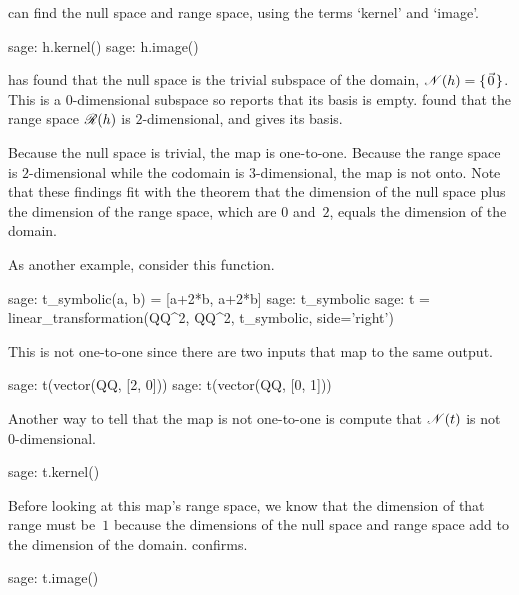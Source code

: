 \Sage{} can find the null space 
and range space, using the 
terms `kernel' and `image'.
\begin{sagecommandline}
sage: h.kernel()                                       
sage: h.image()                                        
\end{sagecommandline}
\Sage{} has found that 
the null space  is the trivial subspace of the domain,
$\mathscr{N}(h)=\mbox{$\{\hspace{0.1em}\vec{0}\hspace{0.1em}\}$}$.
This is a $0$-dimensional
subspace so \Sage{} reports that its basis is empty.
\Sage{} found that the range space $\mathscr{R}(h)$ is $2$-dimensional,
and gives its  basis. 

Because the null space is trivial, the map is one-to-one. 
Because the range space is $2$-dimensional while 
the codomain is $3$-dimensional, the map is not onto.
Note that these findings fit with the theorem that
the dimension of the null space plus the dimension of the 
range space, which are $0$ and~$2$, equals the dimension of the domain.

As another example, consider this function.
\begin{sagecommandline}
sage: t_symbolic(a, b) = [a+2*b, a+2*b]
sage: t_symbolic
sage: t = linear_transformation(QQ^2, QQ^2, t_symbolic, side='right')
\end{sagecommandline}
This is not one-to-one since there are two inputs
that map to the same output.  
\begin{sagecommandline}
sage: t(vector(QQ, [2, 0]))
sage: t(vector(QQ, [0, 1]))
\end{sagecommandline}
\noindent
Another way to tell that the map is not one-to-one is compute that 
$\mathscr{N}(t)$ is not $0$-dimensional.
\begin{sagecommandline}
sage: t.kernel()
\end{sagecommandline}

Before looking at this map's range space, 
we know that the dimension of that range must be~$1$ 
because the dimensions of the null space and
range space add to the dimension of the domain.
\Sage{} confirms.
\begin{sagecommandline}
sage: t.image()
\end{sagecommandline}



